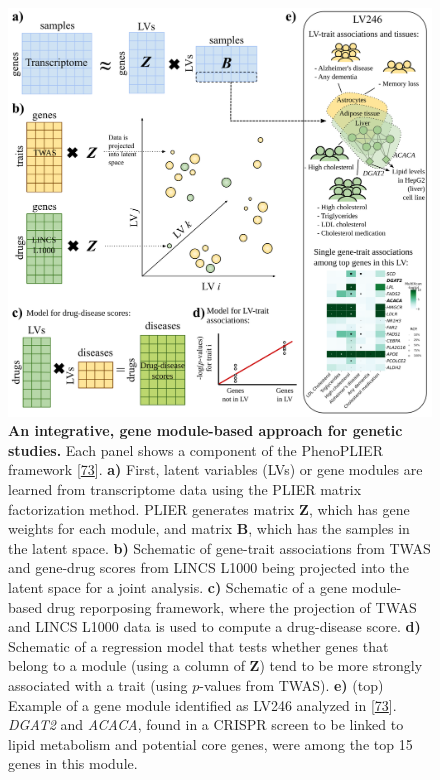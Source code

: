 \begin{figure}
\hypertarget{fig:fig4}{%
\centering
\includegraphics[width=1\textwidth,height=\textheight]{images/fig4.svg}
\caption{\textbf{An integrative, gene module-based approach for genetic studies.}
Each panel shows a component of the PhenoPLIER framework {[}\protect\hyperlink{ref-NM3rHx1i}{73}{]}.
\textbf{a)} First, latent variables (LVs) or gene modules are learned from transcriptome data using the PLIER matrix factorization method.
PLIER generates matrix \(\mathbf{Z}\), which has gene weights for each module, and matrix \(\mathbf{B}\), which has the samples in the latent space.
\textbf{b)} Schematic of gene-trait associations from TWAS and gene-drug scores from LINCS L1000 being projected into the latent space for a joint analysis.
\textbf{c)} Schematic of a gene module-based drug reporposing framework, where the projection of TWAS and LINCS L1000 data is used to compute a drug-disease score.
\textbf{d)} Schematic of a regression model that tests whether genes that belong to a module (using a column of \(\mathbf{Z}\)) tend to be more strongly associated with a trait (using \(p\)-values from TWAS).
\textbf{e)} (top) Example of a gene module identified as LV246 analyzed in {[}\protect\hyperlink{ref-NM3rHx1i}{73}{]}.
\emph{DGAT2} and \emph{ACACA}, found in a CRISPR screen to be linked to lipid metabolism and potential core genes, were among the top 15 genes in this module.
}}
\end{figure}
